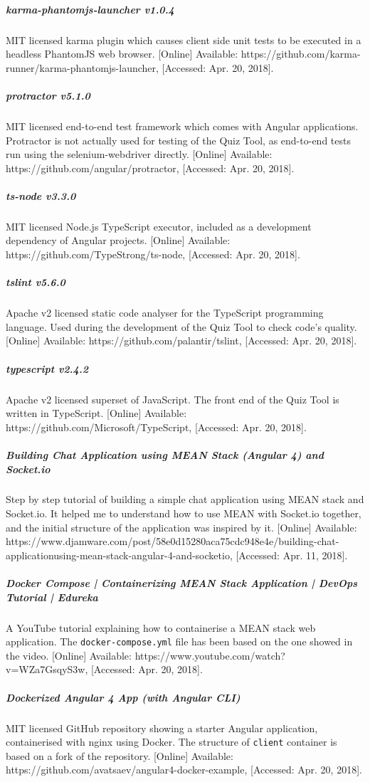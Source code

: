\subparagraph{karma-phantomjs-launcher v1.0.4}
MIT licensed karma plugin which causes client side unit tests to be executed in a headless PhantomJS
web browser. [Online] Available: https://github.com/karma-runner/karma-phantomjs-launcher, [Accessed: Apr. 20, 2018].

\subparagraph{protractor v5.1.0}
MIT licensed end-to-end test framework which comes with Angular applications. Protractor is not
actually used for testing of the Quiz Tool, as end-to-end tests run using the selenium-webdriver directly.
[Online] Available: https://github.com/angular/protractor, [Accessed: Apr. 20, 2018].

\subparagraph{ts-node v3.3.0}
MIT licensed Node.js TypeScript executor, included as a development dependency of Angular projects.
[Online] Available: https://github.com/TypeStrong/ts-node, [Accessed: Apr. 20, 2018].

\subparagraph{tslint v5.6.0}
Apache v2 licensed static code analyser for the TypeScript programming language. Used during
the development of the Quiz Tool to check code's quality.
[Online] Available: https://github.com/palantir/tslint, [Accessed: Apr. 20, 2018].

\subparagraph{typescript v2.4.2}
Apache v2 licensed superset of JavaScript. The front end of the Quiz Tool is written in
TypeScript.
[Online] Available: https://github.com/Microsoft/TypeScript, [Accessed: Apr. 20, 2018].

\subparagraph{Building Chat Application using MEAN Stack (Angular 4) and Socket.io}
Step by step tutorial of building a simple chat application using MEAN stack and Socket.io. It helped me
to understand how to use MEAN with Socket.io together, and the initial structure of the application
was inspired by it.
[Online] Available: https://www.djamware.com/post/58e0d15280aca75cdc948e4e/building-chat-applicationusing-mean-stack-angular-4-and-socketio,
[Accessed: Apr. 11, 2018].

\subparagraph{Docker Compose | Containerizing MEAN Stack Application | DevOps Tutorial | Edureka}
A YouTube tutorial explaining how to containerise a MEAN stack web application. The \texttt{docker-compose.yml}
file has been based on the one showed in the video. [Online] Available: https://www.youtube.com/watch?v=WZa7GsqyS3w,
[Accessed: Apr. 20, 2018].

\subparagraph{Dockerized Angular 4 App (with Angular CLI)}
MIT licensed GitHub repository showing a starter Angular application, containerised with nginx
using Docker. The structure of \texttt{client} container is based on a fork of the repository.
[Online] Available: https://github.com/avatsaev/angular4-docker-example, [Accessed: Apr. 20, 2018].

